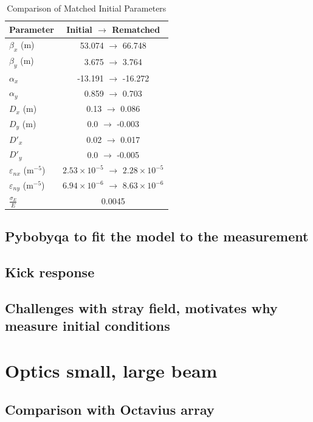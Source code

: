 \documentclass[a4paper,
               biblatex,     %
               ]{jacow}
\begin{document}
\begin{table}[h!]
    \centering
    \caption{Comparison of Matched Initial Parameters}
    \label{tab:initial_conditions_comparison_single_col}
    \begin{tabular}{l c}
        \hline
        Parameter & Initial \(\rightarrow\) Rematched \\
        \hline
        $\beta_x$ (m) & 53.074 \(\rightarrow\) 66.748 \\
        $\beta_y$ (m) & 3.675 \(\rightarrow\) 3.764 \\
        $\alpha_x$ & -13.191 \(\rightarrow\) -16.272 \\
        $\alpha_y$ & 0.859 \(\rightarrow\) 0.703 \\
        $D_x$ (m) & 0.13 \(\rightarrow\) 0.086 \\
        $D_y$ (m) & 0.0 \(\rightarrow\) -0.003 \\
        $D'_x$ & 0.02 \(\rightarrow\) 0.017 \\
        $D'_y$ & 0.0 \(\rightarrow\) -0.005 \\
        $\varepsilon_{nx}$ ($\text{m}^{-5}$) & $2.53 \times 10^{-5}$ \(\rightarrow\) $2.28 \times 10^{-5}$ \\
        $\varepsilon_{ny}$ ($\text{m}^{-5}$) & $6.94 \times 10^{-6}$ \(\rightarrow\) $8.63 \times 10^{-6}$ \\
        $\frac{\sigma_{E}}{E}$ & 0.0045 \\
        \hline
    \end{tabular}
\end{table}

\subsection{Pybobyqa to fit the model to the measurement}
\subsection{Kick response}

\subsection{Challenges with stray field, motivates why measure initial conditions}

\section{Optics small, large beam}
\subsection{Comparison with Octavius array}
\end{document}
